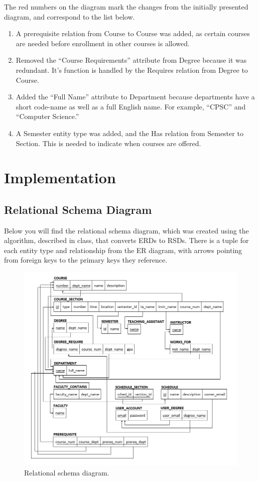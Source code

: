\documentclass[twoside=false,a4paper,11pt]{article}
\theoremstyle{mytheor}
\begin{document}
The red numbers on the diagram mark the changes from the initially presented diagram, and correspond to the list below.

\begin{enumerate}
	\item A prerequisite relation from Course to Course was added, as certain courses are needed before enrollment in other courses is allowed.
	\item Removed the ``Course Requirements'' attribute from Degree because it was redundant. It's function is handled by the Requires relation from Degree to Course.
	\item Added the ``Full Name'' attribute to Department because departments have a short code-name as well as a full English name. For example, ``CPSC'' and ``Computer Science.''
	\item A Semester entity type was added, and the Has relation from Semester to Section.  This is needed to indicate when courses are offered.
\end{enumerate}

\section*{Implementation}

\subsection*{Relational Schema Diagram}

Below you will find the relational schema diagram, which was created using the algorithm, described in class, that converts ERDs to RSDs. There is a tuple for each entity type and relationship from the ER diagram, with arrows pointing from foreign keys to the primary keys they reference.

\begin{figure}[h!]
	\includegraphics[width=\textwidth]{RelationalSchemaDiagram.png} 
	\caption{Relational schema diagram.}
\end{figure}
\end{document}
